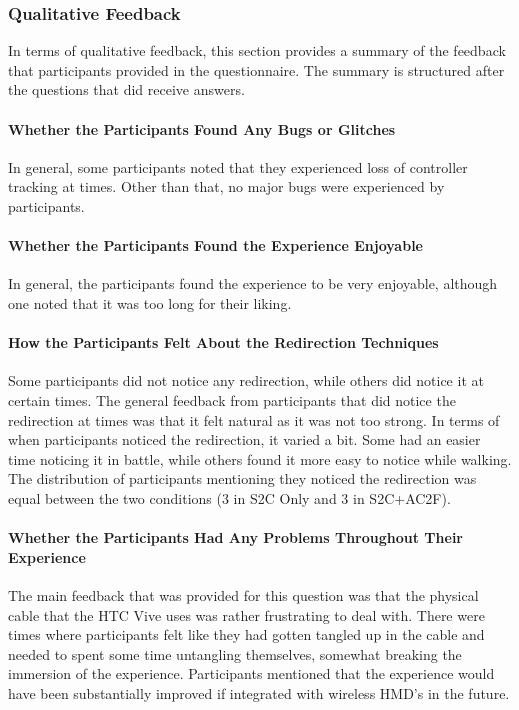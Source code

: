 \subsubsection{Qualitative Feedback}
In terms of qualitative feedback, this section provides a summary of the feedback that participants provided in the questionnaire. The summary is structured after the questions that did receive answers.

\paragraph{Whether the Participants Found Any Bugs or Glitches}
In general, some participants noted that they experienced loss of controller tracking at times. Other than that, no major bugs were experienced by participants.

\paragraph{Whether the Participants Found the Experience Enjoyable}
In general, the participants found the experience to be very enjoyable, although one noted that it was too long for their liking. 

\paragraph{How the Participants Felt About the Redirection Techniques}
Some participants did not notice any redirection, while others did notice it at certain times. The general feedback from participants that did notice the redirection at times was that it felt natural as it was not too strong. In terms of when participants noticed the redirection, it varied a bit. Some had an easier time noticing it in battle, while others found it more easy to notice while walking. The distribution of participants mentioning they noticed the redirection was equal between the two conditions (3 in S2C Only and 3 in S2C+AC2F). 

\paragraph{Whether the Participants Had Any Problems Throughout Their Experience}
The main feedback that was provided for this question was that the physical cable that the HTC Vive uses was rather frustrating to deal with. There were times where participants felt like they had gotten tangled up in the cable and needed to spent some time untangling themselves, somewhat breaking the immersion of the experience. Participants mentioned that the experience would have been substantially improved if integrated with wireless HMD's in the future. 

